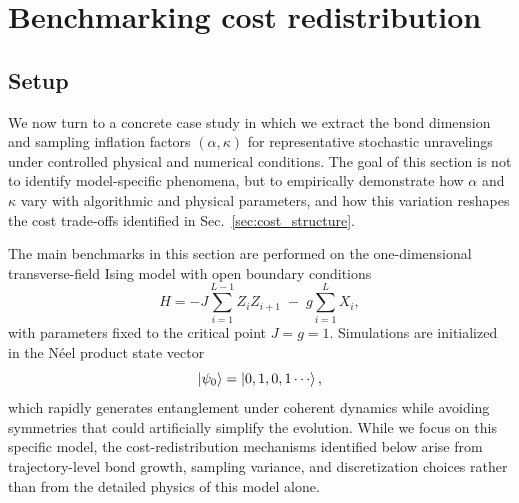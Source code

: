 \documentclass[aps, pra, superscriptaddress, reprint, floatfix]{revtex4-2}
\theoremstyle{plain}
\begin{document}
\section{Benchmarking cost redistribution}
\label{sec:benchmarking}

\subsection{Setup}

We now turn to a concrete case study in which we extract the bond dimension and sampling inflation factors $(\alpha,\kappa)$ for representative stochastic unravelings under controlled physical and numerical conditions. The goal of this section is not to identify model-specific phenomena, but to empirically demonstrate how $\alpha$ and $\kappa$ vary with algorithmic and physical parameters, and how this variation reshapes the cost trade-offs identified in Sec.~\ref{sec:cost_structure}.

The main benchmarks in this section are performed on the one-dimensional transverse-field Ising model with open boundary conditions
\begin{equation}
H = -J \sum_{i=1}^{L-1} Z_i Z_{i+1} \;-\; g \sum_{i=1}^{L} X_i ,
\end{equation}
with parameters fixed to the critical point $J=g=1$. Simulations are initialized in the N\'eel product state vector
\begin{equation}
\ket{\psi_0} = \ket{0,1,0,1\cdots},
\end{equation}
which rapidly generates entanglement under coherent dynamics while avoiding symmetries that could artificially simplify the evolution.
While we focus on this specific model, the cost-redistribution mechanisms identified below arise from trajectory-level bond growth, sampling variance, and discretization choices rather than from the detailed physics of this model alone.
\end{document}
